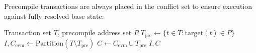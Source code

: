 Precompile transactions are always placed in the conflict set to ensure execution against fully resolved base state:

\begin{algorithm}
\caption{Precompile-Aware Partitioning}
\label{alg:precompile}
\begin{algorithmic}[1]
\REQUIRE Transaction set $T$, precompile address set $P$
\STATE $T_{\text{pre}} \gets \{t \in T : \text{target}(t) \in P\}$
\STATE $I, C_{\text{evm}} \gets \text{Partition}(T \setminus T_{\text{pre}})$
\STATE $C \gets C_{\text{evm}} \cup T_{\text{pre}}$
\RETURN $I, C$
\end{algorithmic}
\end{algorithm}

